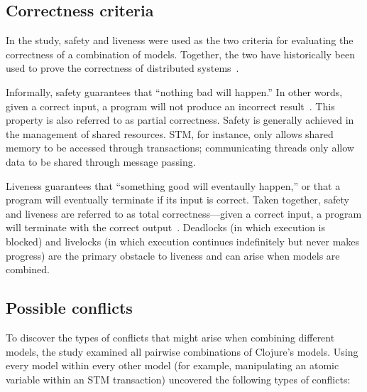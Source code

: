 \documentclass{sig-alternate}
\begin{document}
\subsection{Correctness criteria}

In the study, safety and liveness were used as the two criteria for evaluating the correctness of a combination of models. Together, the two have historically been used to prove the correctness of distributed systems~\cite{Lamport1977}.

Informally, safety guarantees that ``nothing bad will happen.'' In other words, given a correct input, a program will not produce an incorrect result~\cite{Swalens2014}. This property is also referred to as partial correctness. Safety is generally achieved in the management of shared resources. STM, for instance, only allows shared memory to be accessed through transactions; communicating threads only allow data to be shared through message passing.

Liveness guarantees that ``something good will eventaully happen,'' or that a program will eventually terminate if its input is correct. Taken together, safety and liveness are referred to as total correctness---given a correct input, a program will terminate with the correct output~\cite{Swalens2014}. Deadlocks (in which execution is blocked) and livelocks (in which execution continues indefinitely but never makes progress) are the primary obstacle to liveness and can arise when models are combined.

\subsection{Possible conflicts}

To discover the types of conflicts that might arise when combining different models, the study examined all pairwise combinations of Clojure's models. Using every model within every other model (for example, manipulating an atomic variable within an STM transaction) uncovered the following types of conflicts:
\end{document}
